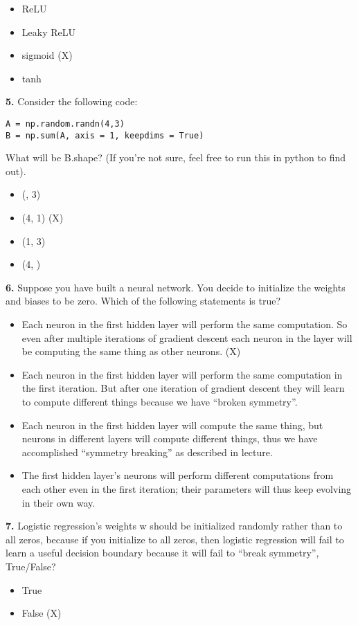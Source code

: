\begin{itemize}
    \item ReLU
    \item Leaky ReLU
    \item sigmoid (X)
    \item tanh
\end{itemize}
\textbf{5.} Consider the following code:
\begin{lstlisting}
A = np.random.randn(4,3)
B = np.sum(A, axis = 1, keepdims = True)
\end{lstlisting}
What will be B.shape? (If you’re not sure, feel free to run this in python to find out).
\begin{itemize}
    \item (, 3)
    \item (4, 1) (X)
    \item (1, 3)
    \item (4, )
\end{itemize}
\textbf{6.} Suppose you have built a neural network. You decide to initialize the weights and biases to be zero. Which of the following statements is true?
\begin{itemize}
    \item Each neuron in the first hidden layer will perform the same computation. So even after multiple iterations of gradient descent each neuron in the layer will be computing the same thing as other neurons. (X)
    \item Each neuron in the first hidden layer will perform the same computation in the first iteration. But after one iteration of gradient descent they will learn to compute different things because we have “broken symmetry”.
    \item Each neuron in the first hidden layer will compute the same thing, but neurons in different layers will compute different things, thus we have accomplished “symmetry breaking” as described in lecture.
    \item The first hidden layer’s neurons will perform different computations from each other even in the first iteration; their parameters will thus keep evolving in their own way.
\end{itemize}
\textbf{7.} Logistic regression’s weights w should be initialized randomly rather than to all zeros, because if you initialize to all zeros, then logistic regression will fail to learn a useful decision boundary because it will fail to “break symmetry”, True/False?
\begin{itemize}
    \item True
    \item False (X)
\end{itemize}
